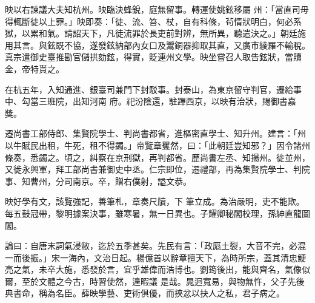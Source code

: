\begin{pinyinscope}
 映以右諫議大夫知杭州。映臨決蜂銳，庭無留事。轉運使姚鉉移屬
 州：「當直司毋得輒斷徒以上罪。」映即奏：「徒、流、笞、杖，自有科條，茍情狀明白，何必系獄，以累和氣。請詔天下，凡徒流罪於長吏前對辨，無所異，聽遣決之。」朝廷施用其言。與鉉既不協，遂發鉉納部內女口及鬻銅器抑取其直，又廣市綾羅不輸稅。真宗遣御史臺推勘官儲拱劾鉉，得實，貶連州文學。映坐嘗召人取告鉉狀，當贖金，帝特貰之。



 在杭五年，入知通進、銀臺司兼門下封駁事。封泰山，為東京留守判官，遷給事中、勾當三班院，出知河南
 府。祀汾陰還，駐蹕西京，以映有治狀，賜御書嘉獎。



 遷尚書工部侍郎、集賢院學士、判尚書都省，進樞密直學士、知升州。建言：「州以牛賦民出租，牛死，租不得蠲。」帝覽章矍然，曰：「此朝廷豈知邪？」因令諸州條奏，悉蠲之。頃之，糾察在京刑獄，再判都省。歷尚書左丞、知揚州。徙並州，又徙永興軍，拜工部尚書兼御史中丞。仁宗即位，遷禮部，再為集賢院學士、判院事、知曹州，分司南京。卒，贈右僕射，謚文恭。



 映好學有文，該覽強記，善筆札，章奏尺牘，下
 筆立成。為治嚴明，吏不能欺。每五鼓冠帶，黎明據案決事，雖寒暑，無一日異也。子耀卿秘閣校理，孫紳直龍圖閣。



 論曰：自唐末詞氣浸敝，迄於五季甚矣。先民有言：「政厖土裂，大音不完，必混一而後振。」宋一海內，文治日起。楊億首以辭章擅天下，為時所宗，蓋其清忠鯁亮之氣，未卒大施，悉發於言，宜乎雄偉而浩博也。劉筠後出，能與齊名，氣像似爾，至於文體之今古，時習使然，遑暇議
 是哉。晁迥寬易，與物無忤，父子先後典書命，稱為名臣。薛映學藝、吏術俱優，而挾忿以抉人之私，君子病之。



\end{pinyinscope}